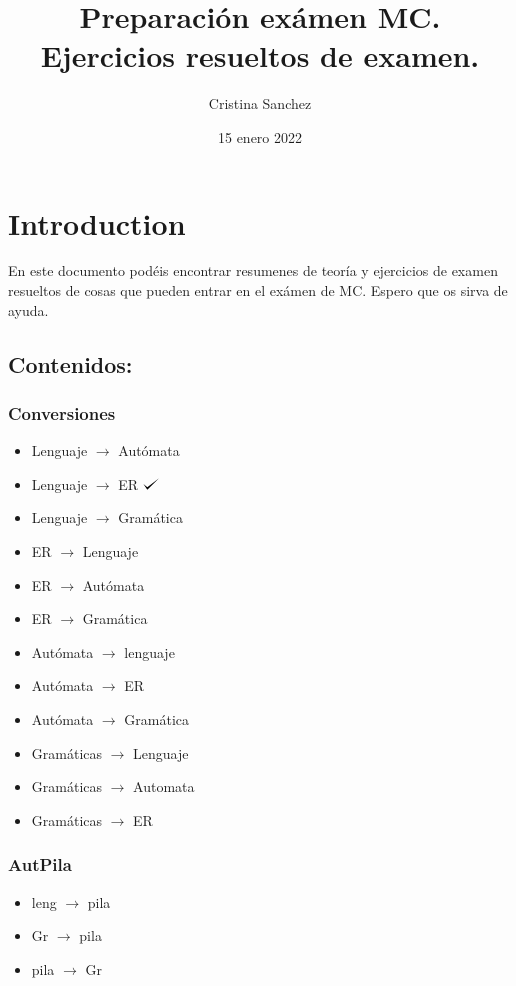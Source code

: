 \documentclass[12pt]{article}
\title{Preparación exámen MC. Ejercicios resueltos de examen.}
\author{Cristina Sanchez}
\date{15 enero 2022}
\def\checkmark{\tikz\fill[scale=0.4](0,.35) -- (.25,0) -- (1,.7) -- (.25,.15) -- cycle;}
\begin{document}
\maketitle

\newpage

\section{Introduction}
En este documento podéis encontrar resumenes de teoría y ejercicios de examen resueltos de cosas que pueden entrar en el exámen de MC. Espero que os sirva de ayuda. 

\subsection{Contenidos:} 
\subsubsection{Conversiones}
\begin{itemize}
    \item Lenguaje $\rightarrow$ Autómata
    \item Lenguaje $\rightarrow$ ER $\checkmark$
    \item Lenguaje $\rightarrow$ Gramática 
    \item ER $\rightarrow$ Lenguaje 
    \item ER $\rightarrow$ Autómata 
    \item ER  $\rightarrow$  Gramática  
    \item Autómata  $\rightarrow$  lenguaje 
    \item Autómata  $\rightarrow$  ER
    \item Autómata  $\rightarrow$ Gramática
    \item Gramáticas  $\rightarrow$  Lenguaje 
    \item Gramáticas  $\rightarrow$  Automata  
    \item Gramáticas  $\rightarrow$  ER
\end{itemize}
\subsubsection{AutPila}
\begin{itemize}
    \item leng $\rightarrow$ pila    
    \item Gr $\rightarrow$ pila 
    \item pila $\rightarrow$ Gr
\end{itemize}
\end{document}
